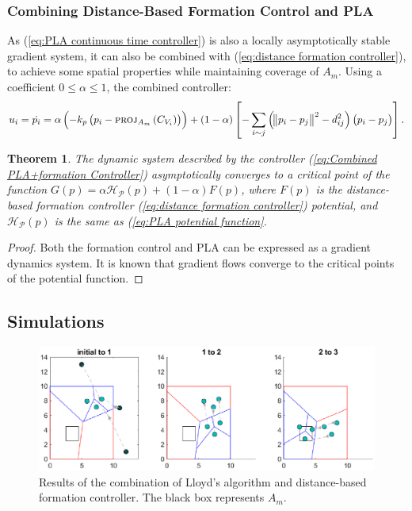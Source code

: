 \documentclass{iacas}
\newtheorem{theorem}{Theorem}
\begin{document}
\subsubsection{Combining Distance-Based Formation Control and PLA}
As (\ref{eq:PLA continuous time controller}) is also a locally asymptotically stable gradient system, it can also be combined with (\ref{eq:distance formation controller}), to achieve some spatial properties while maintaining coverage of $A_m$. Using a coefficient $0 \leq \alpha \leq 1$, the combined controller:
\begin{equation}
    u_{i} = \dot{p_{i}} = \alpha \left(-k_{p}\left( p_i -\textsc{proj}_{A_m}\left( C_{V_{i}} \right) \right)\right) +
    \left( 1-\alpha \right)\left[-\sum_{i \sim j} \left( \norm{p_{i} - p_{j}}^{2} - d_{ij}^2 \right) \left( p_{i} - p_{j} \right)  \right].
    \label{eq:Combined PLA+formation Controller}
\end{equation}

\begin{theorem}
The dynamic system described by the controller (\ref{eq:Combined PLA+formation Controller}) asymptotically converges to a critical point of the function $G(p) = \alpha \mathcal{H}_{\mathcal{P}}(p) + (1-\alpha) F(p)$, where $F(p)$ is the distance-based formation controller (\ref{eq:distance formation controller})  potential, and $\mathcal{H}_{\mathcal{P}}(p)$ is the same as (\ref{eq:PLA potential function}.
    \label{theorem: combined controller stability}
\end{theorem}
\begin{proof}
Both the formation control and PLA can be expressed as a gradient dynamics system. It is
known that gradient flows converge to the critical points of the potential function.
\end{proof}

\subsection{Simulations}

\begin{figure}[H]
\includegraphics[scale=0.8]{figures/proposed-sol/results/sim3-3agents-3partitions-noPLA-formation.eps}
\caption{Results of the combination of Lloyd's algorithm and distance-based formation controller. The black box represents $A_m$.}
\label{fig:results formation, no PLA}
\end{figure}
\end{document}
